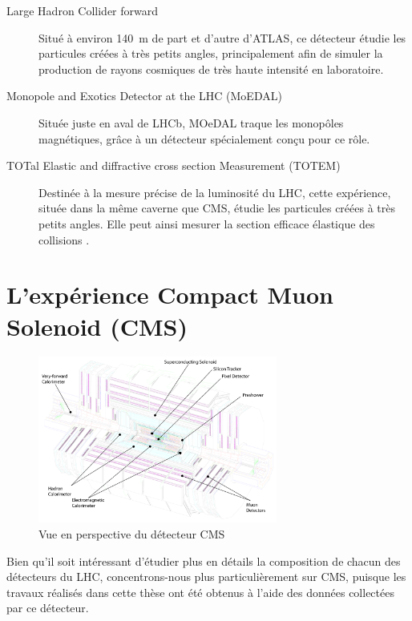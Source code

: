 \begin{description}
  \item[Large Hadron Collider forward] Situé à environ \SI{140}{\m} de part et d'autre d'ATLAS, ce détecteur étudie les particules créées à très petits angles, principalement afin de simuler la production de rayons cosmiques de très haute intensité en laboratoire.
  \item[Monopole and Exotics Detector at the LHC (MoEDAL)] \begin{sloppypar} Située juste en aval de LHCb, MOeDAL traque les monopôles magnétiques, grâce à un détecteur spécialement conçu pour ce rôle. \end{sloppypar}
  \item[TOTal Elastic and diffractive cross section Measurement (TOTEM)] Destinée à la mesure précise de la luminosité du LHC, cette expérience, située dans la même caverne que CMS, étudie les particules créées à très petits angles. Elle peut ainsi mesurer la section efficace élastique des collisions \Pproton{}\Pproton{}.
\end{description}

% 

\section{L'expérience Compact Muon Solenoid (CMS)} \label{sec:cms}

\begin{figure} \centering
  \includegraphics[width=0.7\textwidth]{chapitre2/figs/CMS_2.pdf}
  \caption{Vue en perspective du détecteur CMS}
  \label{fig:cms}
\end{figure}

Bien qu'il soit intéressant d'étudier plus en détails la composition de chacun des détecteurs du LHC, concentrons-nous plus particulièrement sur CMS, puisque les travaux réalisés dans cette thèse ont été obtenus à l'aide des données collectées par ce détecteur.

